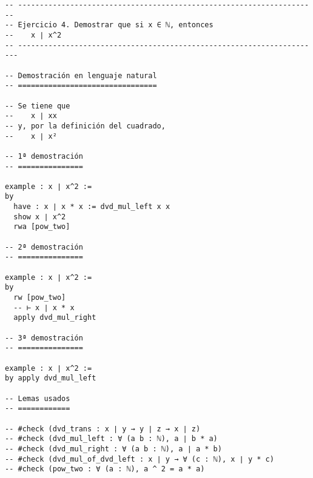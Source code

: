 \begin{verbatim}
-- ---------------------------------------------------------------------
-- Ejercicio 4. Demostrar que si x ∈ ℕ, entonces
--    x ∣ x^2
-- ----------------------------------------------------------------------

-- Demostración en lenguaje natural
-- ================================

-- Se tiene que
--    x ∣ xx
-- y, por la definición del cuadrado,
--    x ∣ x²

-- 1ª demostración
-- ===============

example : x ∣ x^2 :=
by
  have : x ∣ x * x := dvd_mul_left x x
  show x ∣ x^2
  rwa [pow_two]

-- 2ª demostración
-- ===============

example : x ∣ x^2 :=
by
  rw [pow_two]
  -- ⊢ x ∣ x * x
  apply dvd_mul_right

-- 3ª demostración
-- ===============

example : x ∣ x^2 :=
by apply dvd_mul_left

-- Lemas usados
-- ============

-- #check (dvd_trans : x ∣ y → y ∣ z → x ∣ z)
-- #check (dvd_mul_left : ∀ (a b : ℕ), a ∣ b * a)
-- #check (dvd_mul_right : ∀ (a b : ℕ), a ∣ a * b)
-- #check (dvd_mul_of_dvd_left : x ∣ y → ∀ (c : ℕ), x ∣ y * c)
-- #check (pow_two : ∀ (a : ℕ), a ^ 2 = a * a)
\end{verbatim}

